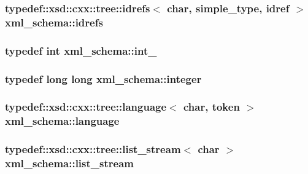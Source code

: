 \subsubsection[{\texorpdfstring{idrefs}{idrefs}}]{\setlength{\rightskip}{0pt plus 5cm}typedef\+::xsd\+::cxx\+::tree\+::idrefs$<$ char, {\bf simple\+\_\+type}, {\bf idref} $>$ {\bf xml\+\_\+schema\+::idrefs}}\hypertarget{namespacexml__schema_aac27fe5af9a5b2ee009fd3c9abe3abe9}{}\label{namespacexml__schema_aac27fe5af9a5b2ee009fd3c9abe3abe9}
\subsubsection[{\texorpdfstring{int\+\_\+}{int_}}]{\setlength{\rightskip}{0pt plus 5cm}typedef int {\bf xml\+\_\+schema\+::int\+\_\+}}\hypertarget{namespacexml__schema_acfa24ac68e1a188e7f44c36f7a158bf4}{}\label{namespacexml__schema_acfa24ac68e1a188e7f44c36f7a158bf4}
\subsubsection[{\texorpdfstring{integer}{integer}}]{\setlength{\rightskip}{0pt plus 5cm}typedef long long {\bf xml\+\_\+schema\+::integer}}\hypertarget{namespacexml__schema_aaaea7c8ce4dfbe26cc52c91c29c97b7c}{}\label{namespacexml__schema_aaaea7c8ce4dfbe26cc52c91c29c97b7c}
\subsubsection[{\texorpdfstring{language}{language}}]{\setlength{\rightskip}{0pt plus 5cm}typedef\+::xsd\+::cxx\+::tree\+::language$<$ char, {\bf token} $>$ {\bf xml\+\_\+schema\+::language}}\hypertarget{namespacexml__schema_a9ccaf8d8efb41ea5331f512f381fc6ce}{}\label{namespacexml__schema_a9ccaf8d8efb41ea5331f512f381fc6ce}
\subsubsection[{\texorpdfstring{list\+\_\+stream}{list_stream}}]{\setlength{\rightskip}{0pt plus 5cm}typedef\+::xsd\+::cxx\+::tree\+::list\+\_\+stream$<$ char $>$ {\bf xml\+\_\+schema\+::list\+\_\+stream}}\hypertarget{namespacexml__schema_a840728106ddd08800e62729d4eddbbc8}{}\label{namespacexml__schema_a840728106ddd08800e62729d4eddbbc8}
